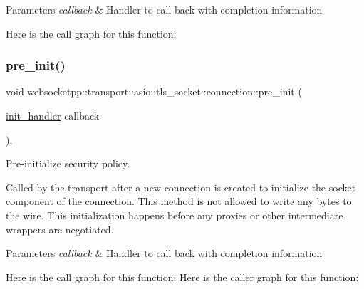 \begin{DoxyParams}{Parameters}
{\em callback} & Handler to call back with completion information \\
\hline
\end{DoxyParams}
Here is the call graph for this function\+:
\mbox{\label{classwebsocketpp_1_1transport_1_1asio_1_1tls__socket_1_1connection_a1e9487282a1c81169ba3818c640fa578}} 
\subsubsection{\texorpdfstring{pre\+\_\+init()}{pre\_init()}}
{\footnotesize\ttfamily void websocketpp\+::transport\+::asio\+::tls\+\_\+socket\+::connection\+::pre\+\_\+init (\begin{DoxyParamCaption}\item[{\mbox{\hyperlink{namespacewebsocketpp_1_1transport_aeae75e675c1a334b3b33ab7120b480a5}{init\+\_\+handler}}}]{callback }\end{DoxyParamCaption})\hspace{0.3cm}{\ttfamily [inline]}, {\ttfamily [protected]}}



Pre-\/initialize security policy. 

Called by the transport after a new connection is created to initialize the socket component of the connection. This method is not allowed to write any bytes to the wire. This initialization happens before any proxies or other intermediate wrappers are negotiated.


\begin{DoxyParams}{Parameters}
{\em callback} & Handler to call back with completion information \\
\hline
\end{DoxyParams}
Here is the call graph for this function\+:
Here is the caller graph for this function\+:
\mbox{\label{classwebsocketpp_1_1transport_1_1asio_1_1tls__socket_1_1connection_a24ad10248362f74dc3cce74c79ee5d82}} 
